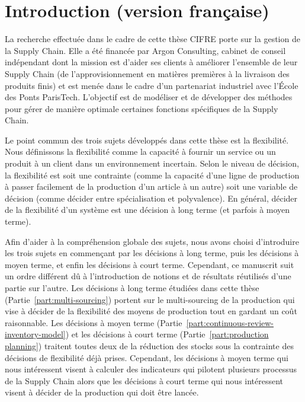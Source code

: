 \chapter{Introduction (version française)}
\label{chap:intro:fr}


La recherche effectuée dans le cadre de cette thèse CIFRE porte sur la gestion de la Supply Chain.
Elle a été financée par Argon Consulting, cabinet de conseil indépendant dont la mission est d'aider ses clients à améliorer l'ensemble de leur Supply Chain (de l'approvisionnement en matières premières à la livraison des produits finis) et est menée dans le cadre d'un partenariat industriel avec l'\'Ecole des Ponts ParisTech.
L'objectif est de modéliser et de développer des méthodes pour gérer de manière optimale certaines fonctions spécifiques de la Supply Chain.


Le point commun des trois sujets développés dans cette thèse est la flexibilité.
Nous définissons la flexibilité comme la capacité à fournir un service ou un produit à un client dans un environnement incertain.
Selon le niveau de décision, la flexibilité est soit une contrainte (comme la capacité d'une ligne de production à passer facilement de la production d'un article à un autre) soit une variable de décision (comme décider entre spécialisation et polyvalence).
En général, décider de la flexibilité d'un système est une décision à long terme (et parfois à moyen terme).


Afin d'aider à la compréhension globale des sujets, nous avons choisi d'introduire les trois sujets en commençant par les décisions à long terme, puis les décisions à moyen terme, et enfin les décisions à court terme.
Cependant, ce manuscrit suit un ordre différent dû à l'introduction de notions et de résultats réutilisés d'une partie sur l'autre.
Les décisions à long terme étudiées dans cette thèse (Partie~\ref{part:multi-sourcing}) portent sur le multi-sourcing de la production qui vise à décider de la flexibilité des moyens de production tout en gardant un coût raisonnable.
Les décisions à moyen terme (Partie~\ref{part:continuous-review-inventory-model}) et les décisions à court terme (Partie~\ref{part:production planning}) traitent toutes deux de la réduction des stocks sous la contrainte des décisions de flexibilité déjà prises.
Cependant, les décisions à moyen terme qui nous intéressent visent à calculer des indicateurs qui pilotent plusieurs processus de la Supply Chain alors que les décisions à court terme qui nous intéressent visent à décider de la production qui doit être lancée.



